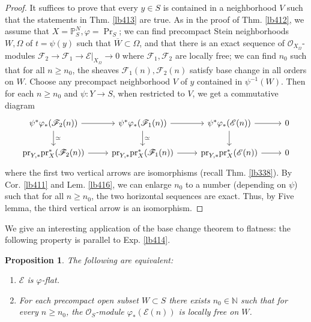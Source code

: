 \documentclass[12pt,b5paper,notitlepage]{report}
\theoremstyle{definition}
\theoremstyle{plain}
\newtheorem{pp}[df]{Proposition}
\newcommand{\ovl}{\overline}
\newcommand{\scr}{\mathscr}
\newcommand{\Nbb}{\mathbb N}
\newcommand{\Pbb}{\mathbb P}
\newcommand{\pr}{\mathrm {pr}}
\numberwithin{equation}{section}
\begin{document}
\begin{proof}
It suffices to prove that every $y\in S$ is contained in a neighborhood $V$ such that the statements in Thm. \ref{lb413} are true. As in the proof of Thm. \ref{lb412}, we assume that $X=\Pbb^N_S,\varphi=\Pr_S$; we can find precompact Stein neighborhoods $W,\Omega$ of $t=\psi(y)$ such that $\ovl W\subset\Omega$, and that there is an exact sequence of $\scr O_{X_\Omega}$-modules $\scr F_2\rightarrow\scr F_1\rightarrow\scr E|_{X_\Omega}\rightarrow 0$ where $\scr F_1,\scr F_2$ are locally free; we can find $n_0$ such that for all $n\geq n_0$, the sheaves $\scr F_1(n),\scr F_2(n)$ satisfy base change in all orders on $W$. Choose any precompact neighborhood $V$ of $y$ contained in $\psi^{-1}(W)$. Then for each $n\geq n_0$ and $\psi:Y\rightarrow S$, when restricted to $V$, we get a commutative diagram
\begin{equation*}
\begin{tikzcd}
\psi^*\varphi_*(\scr F_2(n)) \arrow[r] \arrow[d,"\simeq"] & \psi^*\varphi_*(\scr F_1(n)) \arrow[r] \arrow[d,"\simeq"] & \psi^*\varphi_*(\scr E(n)) \arrow[d] \arrow[r] & 0 \\
\pr_{Y,*}\pr_X^*(\scr F_2(n)) \arrow[r]           & \pr_{Y,*}\pr_X^*(\scr F_1(n)) \arrow[r]           & \pr_{Y,*}\pr_X^*(\scr E(n))     \arrow[r] & 0  
\end{tikzcd}
\end{equation*}
where  the first two vertical arrows are isomorphisms (recall Thm. \ref{lb338}). By Cor. \ref{lb411} and Lem. \ref{lb416}, we can enlarge $n_0$ to a number (depending on $\psi$)  such that for all $n\geq n_0$, the two horizontal sequences are exact. Thus, by Five lemma, the third vertical arrow is an isomorphism. 
\end{proof}






We give an interesting application of the base change theorem to flatness: the following property is parallel to Exp. \ref{lb414}.


\begin{pp}
The following are equivalent:
\begin{enumerate}[label=(\arabic*)]
\item $\scr E$ is $\varphi$-flat.
\item For each precompact open subset $W\subset S$ there exists $n_0\in\Nbb$ such that for every $n\geq n_0$, the $\scr O_S$-module $\varphi_*(\scr E(n))$ is locally free on $W$.
\end{enumerate}
\end{pp}
\end{document}

